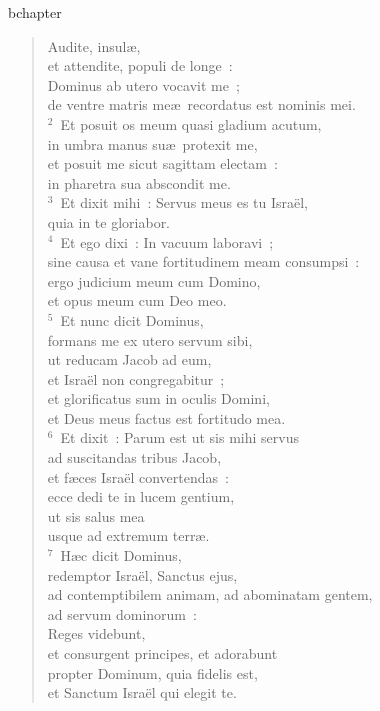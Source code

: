 bchapter\begin{verse}\vspace{-19pt}Audite, insul\ae ,\\ et attendite, populi de longe~:\\ Dominus ab utero vocavit me~;\\ de ventre matris me\ae\ recordatus est nominis mei.\\
${}^{2}$~Et posuit os meum quasi gladium acutum,\\ in umbra manus su\ae\ protexit me,\\ et posuit me sicut sagittam electam~:\\ in pharetra sua abscondit me.\\
${}^{3}$~Et dixit mihi~: Servus meus es tu Isra\"el,\\ quia in te gloriabor.\\
${}^{4}$~Et ego dixi~: In vacuum laboravi~;\\ sine causa et vane fortitudinem meam consumpsi~:\\ ergo judicium meum cum Domino,\\ et opus meum cum Deo meo.\\
${}^{5}$~Et nunc dicit Dominus,\\ formans me ex utero servum sibi,\\ ut reducam Jacob ad eum,\\ et Isra\"el non congregabitur~;\\ et glorificatus sum in oculis Domini,\\ et Deus meus factus est fortitudo mea.\\
${}^{6}$~Et dixit~: Parum est ut sis mihi servus\\ ad suscitandas tribus Jacob,\\ et f\ae ces Isra\"el convertendas~:\\ ecce dedi te in lucem gentium,\\ ut sis salus mea\\ usque ad extremum terr\ae .\\
${}^{7}$~H\ae c dicit Dominus,\\ redemptor Isra\"el, Sanctus ejus,\\ ad contemptibilem animam, ad abominatam gentem,\\ ad servum dominorum~:\\ Reges videbunt,\\ et consurgent principes, et adorabunt\\ propter Dominum, quia fidelis est,\\ et Sanctum Isra\"el qui elegit te.\end{verse}


